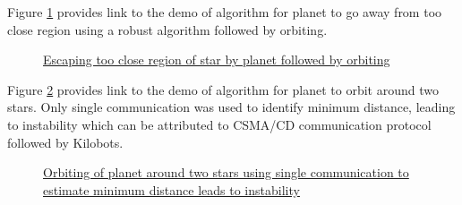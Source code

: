 \documentclass{report}[12pt]
\begin{document}

Figure \ref{fig:orbit_after_escape} provides link to the demo of algorithm for planet to go away from too close region using a robust algorithm followed by orbiting.
\begin{figure}[H]
    \centering
    \caption{\href{https://youtu.be/X6dGCLT0ho8}{Escaping too close region of star by planet followed by orbiting}}
    \label{fig:orbit_after_escape}
\end{figure}

Figure \ref{fig:orbit_two_star_comm1} provides link to the demo of algorithm for planet to orbit around two stars. Only single communication was used to identify minimum distance, leading to instability which can be attributed to CSMA/CD \cite{WEBOPEDIA-csma-cd} communication protocol followed by Kilobots.
\begin{figure}[H]
    \centering
    \caption{\href{https://youtu.be/mhW04WvGKuQ}{Orbiting of planet around two stars using single communication to estimate minimum distance leads to instability}}
    \label{fig:orbit_two_star_comm1}
\end{figure}
\end{document}
